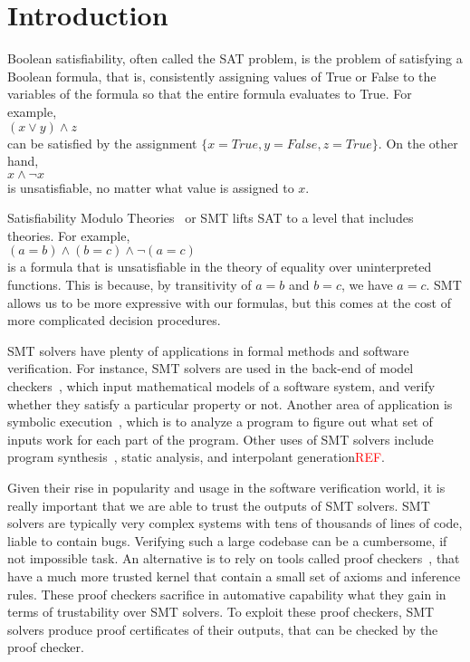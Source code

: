 \documentclass{report}
\begin{document}
\section{Introduction}
\label{sec:intro}
Boolean satisfiability, often called the SAT problem, 
is the problem of satisfying a Boolean formula, that is, 
consistently assigning values of True or False to the variables 
of the formula so that the entire formula evaluates to True. 
For example, \\ 
$(x \lor y) \land z$ \\
can be satisfied by the 
assignment $\{x=True,y=False,z=True\}$. On the other hand, \\
$x \land \neg x$ \\
is unsatisfiable, no matter what value is assigned to $x$.

Satisfiability Modulo Theories~\cite{DBLP:reference/mc/BarrettT18} or SMT 
lifts SAT to a level that includes theories. 
For example, \\
$(a = b) \land (b = c) \land \neg (a = c)$ \\
is a formula that is unsatisfiable in the theory of 
equality over uninterpreted functions. This is because, by
transitivity of $a = b$ and $b = c$, we have $a = c$. SMT 
allows us to be more expressive with our formulas, but 
this comes at the cost of more complicated decision 
procedures.

SMT solvers have plenty of applications in formal methods 
and software verification. For instance, SMT solvers are used 
in the back-end of model checkers~\cite{DBLP:books/daglib/0020348}, which input mathematical 
models of a software system, and verify whether they 
satisfy a particular property or not. Another area of 
application is symbolic
execution~\cite{DBLP:journals/csur/BaldoniCDDF18}, 
which is to analyze a 
program to figure out what set of inputs work for each 
part of the program. Other uses of SMT solvers include 
program synthesis~\cite{synth}, static analysis, 
and interpolant generation\textcolor{red}{REF}.

Given their rise in popularity and usage in the software 
verification world, it is really important that we are able 
to trust the outputs of SMT solvers. SMT solvers are typically 
very complex systems with tens of thousands of lines of code, 
liable to contain bugs. Verifying such a large codebase can 
be a cumbersome, if not impossible task. An alternative is 
to rely on tools called proof checkers~\cite{proofasst}, 
that have a much more trusted kernel that contain a small 
set of axioms and inference rules. These proof checkers 
sacrifice in automative capability what they gain in terms 
of trustability over SMT solvers. To exploit these proof 
checkers, SMT solvers produce proof certificates of their 
outputs, that can be checked by the proof checker.
\end{document}
